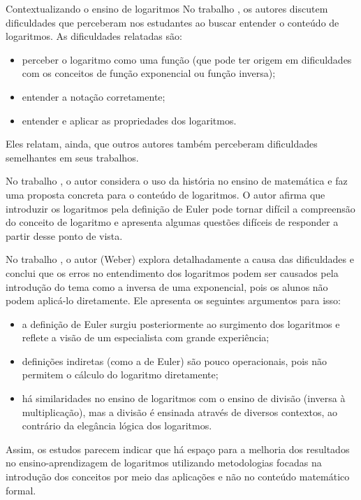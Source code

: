 \begin{apresentacao}{Contextualizando o ensino de logaritmos}
No trabalho \citep{Kenney2013}, os autores discutem dificuldades que perceberam nos estudantes ao buscar entender o conteúdo de logaritmos. As dificuldades relatadas são:
	\begin{itemize}
	\item perceber o logaritmo como uma função (que pode ter origem em dificuldades com os conceitos de função exponencial ou função inversa);
	\item entender a notação corretamente; 
	\item entender e aplicar as propriedades dos logaritmos.
	\end{itemize}
Eles relatam, ainda, que outros autores também perceberam dificuldades semelhantes em seus trabalhos.

No trabalho \citep{Panagiotou2011}, o autor considera o uso da história no ensino de matemática e faz uma proposta concreta para o conteúdo de logaritmos. O autor afirma que introduzir os logaritmos pela definição de Euler pode tornar difícil a compreensão do conceito de logaritmo e apresenta algumas questões difíceis de responder a partir desse ponto de vista.

No trabalho \citep{Weber2016}, o autor (Weber) explora detalhadamente a causa das dificuldades e conclui que os erros no entendimento dos logaritmos podem ser causados pela introdução do tema como a inversa de uma exponencial, pois os alunos não podem aplicá-lo diretamente. Ele apresenta os seguintes argumentos para isso:
\begin{itemize}
\item a definição de Euler surgiu posteriormente ao surgimento dos logaritmos e reflete a visão de um especialista com grande experiência;
\item definições indiretas (como a de Euler) são pouco operacionais, pois não permitem o cálculo do logaritmo diretamente;
\item há similaridades no ensino de logaritmos com o ensino de divisão (inversa à multiplicação), mas a divisão é ensinada através de diversos contextos, ao contrário da elegância lógica dos logaritmos.
\end{itemize}
	
Assim, os estudos parecem indicar que há espaço para a melhoria dos resultados no ensino-aprendizagem de logaritmos utilizando metodologias focadas na introdução dos conceitos por meio das aplicações e não no conteúdo matemático formal.


\end{apresentacao}
